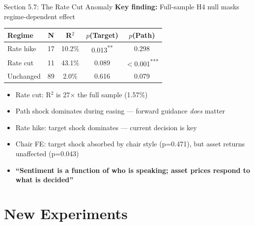 \documentclass[aspectratio=169, 11pt]{beamer}
\begin{document}
\begin{frame}{Section 5.7: The Rate Cut Anomaly}
\textbf{Key finding:} Full-sample H4 null masks regime-dependent effect

\vspace{0.5em}
\begin{tabular}{lcccc}
\toprule
Regime & N & R$^2$ & $p$(Target) & $p$(Path) \\
\midrule
Rate hike & 17 & 10.2\% & 0.013\textsuperscript{**} & 0.298 \\
\alert{Rate cut} & \alert{11} & \alert{43.1\%} & 0.089 & \alert{$<$0.001\textsuperscript{***}} \\
Unchanged & 89 & 2.0\% & 0.616 & 0.079 \\
\bottomrule
\end{tabular}

\vspace{0.5em}
\begin{itemize}
  \item Rate cut: R$^2$ is \alert{27$\times$} the full sample (1.57\%)
  \item Path shock dominates during easing --- forward guidance \emph{does} matter
  \item Rate hike: target shock dominates --- current decision is key
  \item Chair FE: target shock absorbed by chair style (p=0.471), but asset returns unaffected (p=0.043)
  \item \textbf{``Sentiment is a function of who is speaking; asset prices respond to what is decided''}
\end{itemize}
\end{frame}

\section{New Experiments}
\end{document}
